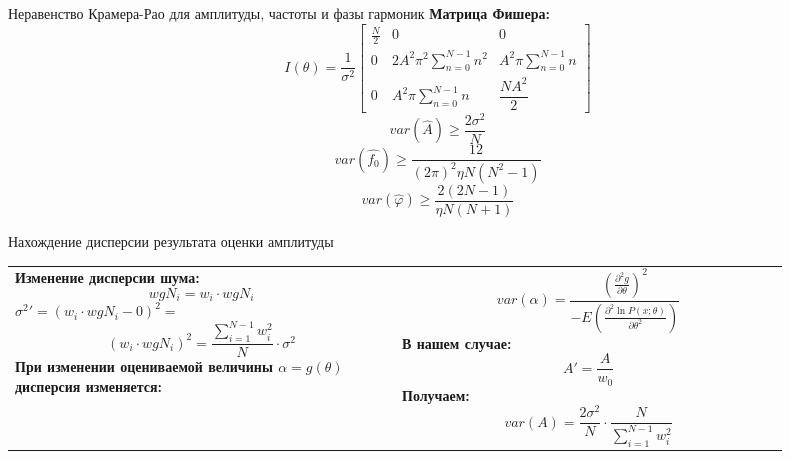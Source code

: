 \begin{frame}{Неравенство Крамера-Рао для амплитуды, частоты и фазы гармоник}
\textbf{Матрица Фишера:}
\begin{equation}
\label{eq:equation15}
I(\theta) = \frac{1}{\sigma^2}
\begin{bmatrix}
	\frac{N}{2} & 0 & 0 \\
	0 & 2A^2 \pi^2 \displaystyle\sum_{n=0}^{N-1} n^2 & A^2 \pi \displaystyle\sum_{n=0}^{N-1} n \\
	0 & A^2 \pi \displaystyle\sum_{n=0}^{N-1} n & \dfrac{NA^2}{2}
\end{bmatrix}
\end{equation}
\begin{equation}
\label{eq:equation16}
var(\hat{A})\geq \frac{2  \sigma^2}{N} 
\end{equation}
\begin{equation}
\label{eq:equation17}
var(\hat{f_0})\geq \frac{12}{(2\pi)^2 \eta  N(N^2 - 1)}  
\end{equation}
\begin{equation}
\label{eq:equation18}
var(\hat{\varphi})\geq \frac{2(2N-1)}{\eta N(N+1)}  
\end{equation}
\end{frame}

\begin{frame}{Нахождение дисперсии результата оценки амплитуды}
\begin{tabular}{m{0.45\linewidth}m{0.45\linewidth}}
\textbf{Изменение дисперсии шума:}
\begin{equation}
\label{eq:equation19}
w g N_i = w_i \cdot w g N_i
\end{equation}
${\sigma^2}' = (w_i \cdot w g N_i - 0)^2=$
\begin{equation}
\label{eq:equation19}
(w_i \cdot w g N_i)^2 =\frac{\displaystyle\sum_{i=1}^{N-1} w_i^2}{N} \cdot \sigma^2
\end{equation}
\textbf{При изменении оцениваемой величины $\alpha=g(\theta)$ дисперсия изменяется:}

&
\begin{equation}
	\label{eq:equation19}
	var (\alpha) = \frac{ \left({\frac{\partial^2 g}{\partial \theta}}\right)^2}{-E \left(\frac{\partial ^2 \ln P(x; \theta)}{\partial \theta^2} \right) }
\end{equation}
\textbf{В нашем случае:}
\begin{equation}
\label{eq:equation19}
A'= \frac{A}{w_0}
\end{equation}
\textbf{Получаем:}
\begin{equation}
	\label{eq:equation19}
	var(A)= \frac{2\sigma^2}{N}\cdot \frac{N}{\displaystyle\sum_{i=1}^{N-1} w_i^2}
\end{equation}
\end{tabular}
\end{frame}


